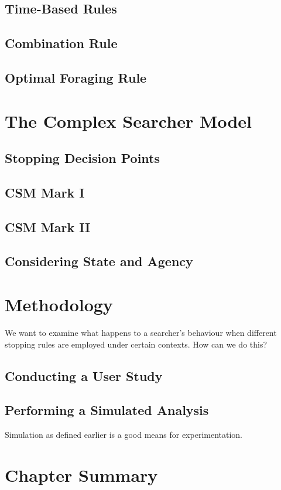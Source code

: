 \subsection{Time-Based Rules}

\subsection{Combination Rule}

\subsection{Optimal Foraging Rule}

\section{The Complex Searcher Model}\label{sec:proposal:csm}

\subsection{Stopping Decision Points}

\subsection{CSM Mark I}

\subsection{CSM Mark II}

\subsection{Considering State and Agency}

\section{Methodology}\label{sec:proposal:method}

We want to examine what happens to a searcher's behaviour when different stopping rules are employed under certain contexts.
How can we do this?

\subsection{Conducting a User Study}

\subsection{Performing a Simulated Analysis}
Simulation as defined earlier is a good means for experimentation.

\section{Chapter Summary}
